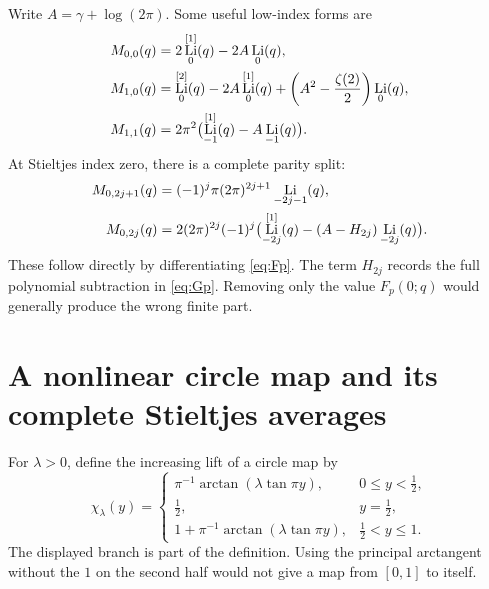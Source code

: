 \documentclass[11pt]{article}
\theoremstyle{definition}\newtheorem{definition}[theorem]{Definition}
\theoremstyle{remark}\newtheorem{remark}[theorem]{Remark}
\DeclareMathOperator{\Li}{Li}
\newcommand{\LiJ}[2]{\Li_{#1}^{[#2]}}
\begin{document}
Write $A=\gamma+\log(2\pi)$. Some useful low-index forms are
\begin{align}\label{eq:Poisson-low}
M_{0,0}(q)&=2\LiJ{0}{1}(q)-2A\Li_0(q),\\
M_{1,0}(q)&=\LiJ{0}{2}(q)-2A\LiJ{0}{1}(q)
+\left(A^2-\frac{\zeta(2)}2\right)\Li_0(q),\notag\\
M_{1,1}(q)&=2\pi^2\bigl(\LiJ{-1}{1}(q)-A\Li_{-1}(q)\bigr).\notag
\end{align}
At Stieltjes index zero, there is a complete parity split:
\begin{align}\label{eq:Poisson-parity}
M_{0,2j+1}(q)&=(-1)^j\pi(2\pi)^{2j+1}\Li_{-2j-1}(q),\\
M_{0,2j}(q)&=2(2\pi)^{2j}(-1)^j
\bigl(\LiJ{-2j}{1}(q)-(A-H_{2j})\Li_{-2j}(q)\bigr).\notag
\end{align}
These follow directly by differentiating \eqref{eq:Fp}. The term $H_{2j}$ records the full polynomial subtraction in \eqref{eq:Gp}. Removing only the value $F_p(0;q)$ would generally produce the wrong finite part.

\section{A nonlinear circle map and its complete Stieltjes averages}
\label{sec:circle}
For $\lambda>0$, define the increasing lift of a circle map by
\begin{equation}\label{eq:chi}
\chi_\lambda(y)=
\begin{cases}
\pi^{-1}\arctan(\lambda\tan\pi y),&0\le y<\tfrac12,\\
\tfrac12,&y=\tfrac12,\\
1+\pi^{-1}\arctan(\lambda\tan\pi y),&\tfrac12<y\le1.
\end{cases}
\end{equation}
The displayed branch is part of the definition. Using the principal arctangent without the $1$ on the second half would not give a map from $[0,1]$ to itself.
\end{document}
